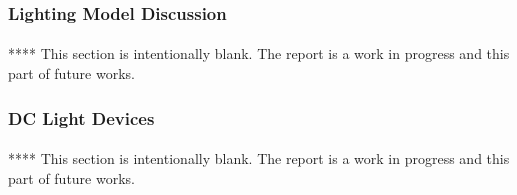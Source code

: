 \subsubsection{Lighting Model Discussion}

\paragraph{}
****
\newline
This section is intentionally blank. The report is a work in progress and this part of future works.  


\subsubsection{DC Light Devices}

\paragraph{}
****
\newline
This section is intentionally blank. The report is a work in progress and this part of future works.  

